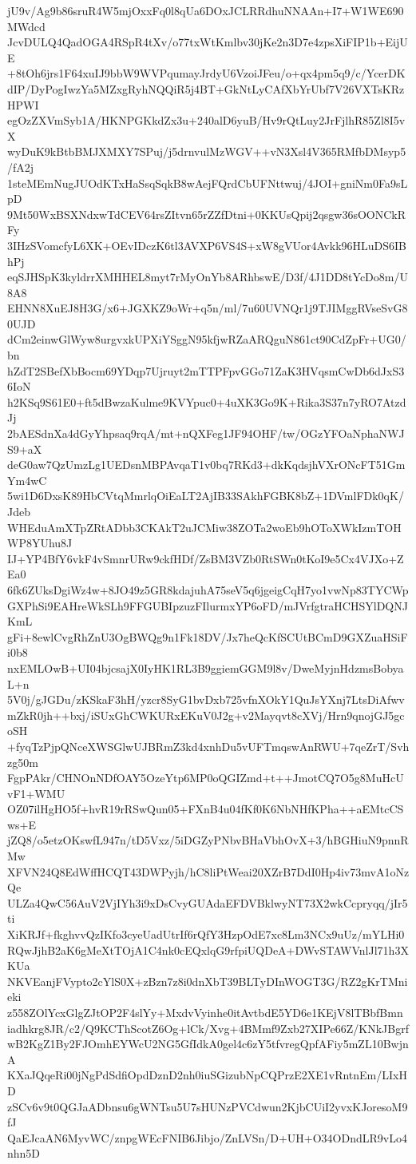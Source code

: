 jU9v/Ag9b86sruR4W5mjOxxFq0l8qUa6DOxJCLRRdhuNNAAn+I7+W1WE690MWdcd
JcvDULQ4QadOGA4RSpR4tXv/o77txWtKmlbv30jKe2n3D7e4zpsXiFIP1b+EijUE
+8tOh6jrs1F64xuIJ9bbW9WVPqumayJrdyU6VzoiJFeu/o+qx4pm5q9/c/YcerDK
dIP/DyPogIwzYa5MZxgRyhNQQiR5j4BT+GkNtLyCAfXbYrUbf7V26VXTsKRzHPWI
egOzZXVmSyb1A/HKNPGKkdZx3u+240alD6yuB/Hv9rQtLuy2JrFjlhR85Zl8I5vX
wyDuK9kBtbBMJXMXY7SPuj/j5drnvulMzWGV++vN3Xsl4V365RMfbDMsyp5/fA2j
1steMEmNugJUOdKTxHaSsqSqkB8wAejFQrdCbUFNttwuj/4JOI+gniNm0Fa9sLpD
9Mt50WxBSXNdxwTdCEV64rsZItvn65rZZfDtni+0KKUsQpij2qsgw36sOONCkRFy
3IHzSVomcfyL6XK+OEvIDczK6tl3AVXP6VS4S+xW8gVUor4Avkk96HLuDS6IBhPj
eqSJHSpK3kyldrrXMHHEL8myt7rMyOnYb8ARhbswE/D3f/4J1DD8tYcDo8m/U8A8
EHNN8XuEJ8H3G/x6+JGXKZ9oWr+q5n/ml/7u60UVNQr1j9TJIMggRVseSvG80UJD
dCm2einwGlWyw8urgvxkUPXiYSggN95kfjwRZaARQguN861ct90CdZpFr+UG0/bn
hZdT2SBefXbBocm69YDqp7Ujruyt2mTTPFpvGGo71ZaK3HVqsmCwDb6dJxS36IoN
h2KSq9S61E0+ft5dBwzaKulme9KVYpuc0+4uXK3Go9K+Rika3S37n7yRO7AtzdJj
2bAESdnXa4dGyYhpsaq9rqA/mt+nQXFeg1JF94OHF/tw/OGzYFOaNphaNWJS9+aX
deG0aw7QzUmzLg1UEDsnMBPAvqaT1v0bq7RKd3+dkKqdsjhVXrONcFT51GmYm4wC
5wi1D6DxsK89HbCVtqMmrlqOiEaLT2AjIB33SAkhFGBK8bZ+1DVmlFDk0qK/Jdeb
WHEduAmXTpZRtADbb3CKAkT2uJCMiw38ZOTa2woEb9hOToXWkIzmTOHWP8YUhu8J
IJ+YP4BfY6vkF4vSmnrURw9ckfHDf/ZsBM3VZb0RtSWn0tKoI9e5Cx4VJXo+ZEa0
6fk6ZUksDgiWz4w+8JO49z5GR8kdajuhA75seV5q6jgeigCqH7yo1vwNp83TYCWp
GXPhSi9EAHreWkSLh9FFGUBIpzuzFIlurmxYP6oFD/mJVrfgtraHCHSYlDQNJKmL
gFi+8ewlCvgRhZnU3OgBWQg9n1Fk18DV/Jx7heQcKfSCUtBCmD9GXZuaHSiFi0b8
nxEMLOwB+UI04bjcsajX0IyHK1RL3B9ggiemGGM9l8v/DweMyjnHdzmsBobyaL+n
5V0j/gJGDu/zKSkaF3hH/yzcr8SyG1bvDxb725vfnXOkY1QuJsYXnj7LtsDiAfwv
mZkR0jh++bxj/iSUxGhCWKURxEKuV0J2g+v2Mayqvt8cXVj/Hrn9qnojGJ5gcoSH
+fyqTzPjpQNceXWSGlwUJBRmZ3kd4xnhDu5vUFTmqswAnRWU+7qeZrT/Svhzg50m
FgpPAkr/CHNOnNDfOAY5OzeYtp6MP0oQGIZmd+t++JmotCQ7O5g8MuHcUvF1+WMU
OZ07ilHgHO5f+hvR19rRSwQun05+FXnB4u04fKf0K6NbNHfKPha++aEMtcCSws+E
jZQ8/o5etzOKswfL947n/tD5Vxz/5iDGZyPNbvBHaVbhOvX+3/hBGHiuN9pnnRMw
XFVN24Q8EdWffHCQT43DWPyjh/hC8liPtWeai20XZrB7DdI0Hp4iv73mvA1oNzQe
ULZa4QwC56AuV2VjIYh3i9xDsCvyGUAdaEFDVBklwyNT73X2wkCcpryqq/jIr5ti
XiKRJf+fkghvvQzIKfo3cyeUadUtrIf6rQfY3HzpOdE7xc8Lm3NCx9uUz/mYLHi0
RQwJjhB2aK6gMeXtTOjA1C4nk0cEQxlqG9rfpiUQDeA+DWvSTAWVnlJl71h3XKUa
NKVEanjFVypto2cYlS0X+zBzn7z8i0dnXbT39BLTyDInWOGT3G/RZ2gKrTMnieki
z558ZOlYcxGlgZJtOP2F4slYy+MxdvVyinhe0itAvtbdE5YD6e1KEjV8lTBbfBmn
iadhkrg8JR/c2/Q9KCThScotZ6Og+lCk/Xvg+4BMmf9Zxb27XIPe66Z/KNkJBgrf
wB2KgZ1By2FJOmhEYWcU2NG5GfIdkA0gel4c6zY5tfvregQpfAFiy5mZL10BwjnA
KXaJQqeRi00jNgPdSdfiOpdDznD2nh0iuSGizubNpCQPrzE2XE1vRntnEm/LIxHD
zSCv6v9t0QGJaADbnsu6gWNTsu5U7sHUNzPVCdwun2KjbCUiI2yvxKJoresoM9fJ
QaEJcaAN6MyvWC/znpgWEcFNIB6Jibjo/ZnLVSn/D+UH+O34ODndLR9vLo4nhn5D

